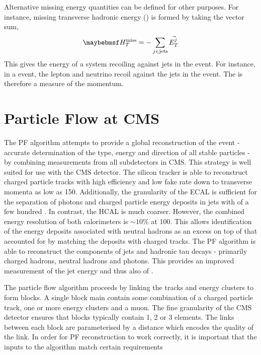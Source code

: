 Alternative missing energy quantities can be defined for other purposes. For
instance, missing transverse hadronic energy (\MHT) is formed by taking the
vector sum,
\begin{equation}
\MHT = -\sum_{j \in \textrm{jets}} \vec{E_T^j}
\end{equation}
This gives the energy of a system recoiling against jets in the event. For
instance, in a \Wjets event, the lepton and neutrino recoil against the jets in
the event. The \MHT is therefore a measure of the \PW momentum.


\section{Particle Flow at \ac{CMS}}
\label{sec:reco_pf}
The \ac{PF} algorithm \cite{cms_pf_pas} attempts to provide a global
reconstruction of the event - accurate determination of the type, energy and
direction of all stable particles - by combining measurements from all
subdetectors in \ac{CMS}. This strategy is well suited for use with the \ac{CMS}
detector. The silicon tracker is able to reconstruct charged particle tracks
with high efficiency and low fake rate down to transverse momenta as low as
\unit{150}{\MeV}. Additionally, the granularity of the \ac{ECAL} is sufficient
for the separation of photons and charged particle energy deposits in jets with
\Pt of a few hundred \GeV. In contrast, the \ac{HCAL} is much coarser. However,
the combined energy resolution of both calorimeters is $\sim 10\%$ at
\unit{100}{\GeV}. This allows identification of the energy deposits associated
with neutral hadrons as an excess on top of that accounted for by matching the
deposits with charged tracks. The \ac{PF} algorithm is able to reconstruct the
components of jets and hadronic tau decays - primarily charged hadrons, neutral
hadrons and photons. This provides an improved measurement of the jet energy and
thus also of \MET.

The particle flow algorithm proceeds by linking the tracks and energy clusters
to form blocks. A single block main contain some combination of a charged
particle track, one or more energy clusters and a muon. The fine granularity of
the \ac{CMS} detector ensures that blocks typically contain 1, 2 or 3 elements.
The links between each block are parameterised by a distance which encodes the
quality of the link. In order for \ac{PF} reconstruction to work correctly, it
is important that the inputs to the algorithm match certain requirements

